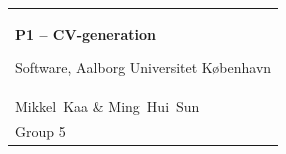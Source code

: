 %
\begin{titlepage}
\vspace*{\fill}
  \noindent%
  {\color{white}\colorbox{aaublue}{\begin{tabular}{@{}p{\textwidth}@{}}
    \begin{center}
    \Huge{\textbf{%
      P1 -- CV-generation
    }}
    \end{center}
    \begin{center}
      \Large{%
        Software, Aalborg Universitet København
      }
    \end{center}
    \vspace{0.2cm}
   \begin{center}
    {\Large%
      David~Doctor~Heyde~Rasmussen, Hans~Erik~Heje,\\ Mikkel~Kaa \& Ming~Hui~Sun
    }\\
    \vspace{0.2cm}
    {\large%
      Group 5
    }
   \end{center}
   \vspace{0.2cm}


\end{tabular}}}
\end{titlepage}
